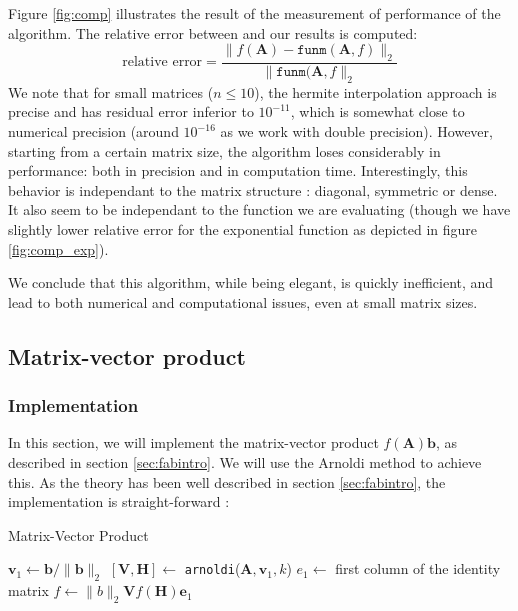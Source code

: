 \documentclass[11pt]{article}
\numberwithin{equation}{section}
\begin{document}
Figure \ref{fig:comp} illustrates the result of the measurement of performance of the algorithm. The relative error between \cite{davies2003schur} and our results is computed:
\begin{equation*}
    \text{relative error} = \frac{\|f(\mathbf{A})-\texttt{funm}(\mathbf{A},f)\|_2}{\|\texttt{funm}(\mathbf{A},f\|_2}
\end{equation*}
We note that for small matrices ($n\leq 10$), the hermite interpolation approach is precise and has residual error inferior to $10^{-11}$, which is somewhat close to numerical precision (around $10^{-16}$ as we work with double precision). However, starting from a certain matrix size, the algorithm loses considerably in performance: both in precision and in computation time. Interestingly, this behavior is independant to the matrix structure : diagonal, symmetric or dense. It also seem to be independant to the function we are evaluating (though we have slightly lower relative error for the exponential function as depicted in figure \ref{fig:comp_exp}).

We conclude that this algorithm, while being elegant, is quickly inefficient, and lead to both numerical and computational issues, even at small matrix sizes.

\subsection{Matrix-vector product}
\subsubsection{Implementation}
In this section, we will implement the matrix-vector product $f(\mathbf{A})\mathbf{b}$, as described in section \ref{sec:fabintro}. We will use the Arnoldi method to achieve this. As the theory has been well described in section \ref{sec:fabintro}, the implementation is straight-forward :
\begin{algorithm2e}
    \SetAlgoLined
    \caption{Matrix-Vector Product}
    $\mathbf{v}_1 \gets \mathbf{b}/\|\mathbf{b}\|_2$\;
    $[\mathbf{V},\mathbf{H}] \gets$ \texttt{arnoldi}($\mathbf{A},\mathbf{v}_1,k$)\;
    $e_1 \gets$ first column of the identity matrix\;
    $f \gets \|b\|_2\mathbf{V}f(\mathbf{H})\mathbf{e}_1$\;
\end{algorithm2e}
\end{document}
